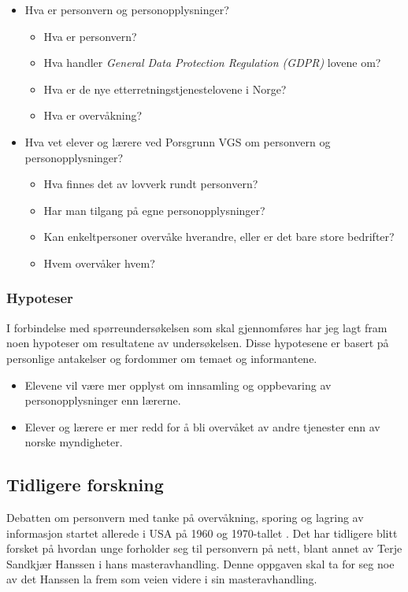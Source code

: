 \begin{itemize}
    \item Hva er personvern og personopplysninger?
    \begin{itemize}
        \item Hva er personvern?
        \item Hva handler \textit{General Data Protection Regulation (GDPR)} lovene om?
        \item Hva er de nye etterretningstjenestelovene i Norge?
        \item Hva er overvåkning?
    \end{itemize}
    \item Hva vet elever og lærere ved Porsgrunn VGS om personvern og personopplysninger?
    \begin{itemize}
        \item Hva finnes det av lovverk rundt personvern?
        \item Har man tilgang på egne personopplysninger?
        \item Kan enkeltpersoner overvåke hverandre, eller er det bare store bedrifter? 
        \item Hvem overvåker hvem?
    \end{itemize}
\end{itemize}

\subsubsection{Hypoteser}\label{subsubsec:hypoteser}
I forbindelse med spørreundersøkelsen som skal gjennomføres har jeg lagt fram noen hypoteser om resultatene av undersøkelsen. Disse hypotesene er basert på personlige antakelser og fordommer om temaet og informantene.

\begin{itemize}
    \item Elevene vil være mer opplyst om innsamling og oppbevaring av personopplysninger enn lærerne.
    \item Elever og lærere er mer redd for å bli overvåket av andre tjenester enn av norske myndigheter.
\end{itemize}

\subsection{Tidligere forskning}
Debatten om personvern med tanke på overvåkning, sporing og lagring av informasjon startet allerede i USA på 1960 og 1970-tallet \parencite[36]{bok:nissenbaum}. Det har tidligere blitt forsket på hvordan unge forholder seg til personvern på nett, blant annet av Terje Sandkjær Hanssen i hans masteravhandling. Denne oppgaven skal ta for seg noe av det Hanssen la frem som veien videre i sin masteravhandling. \parencite{master:hanssen}

